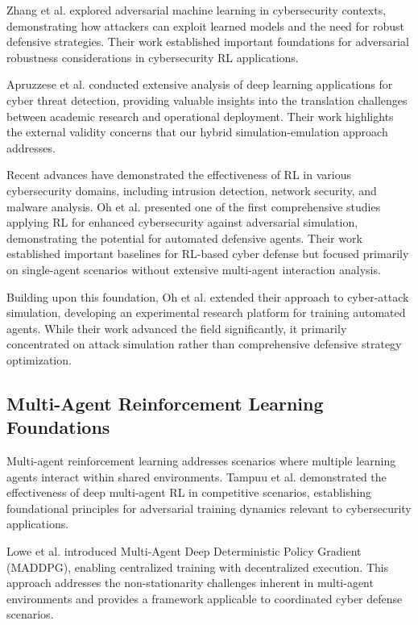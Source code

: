 \documentclass[12pt,twoside]{article}
\theoremstyle{definition}
\theoremstyle{plain}
\begin{document}
Zhang et al. \cite{zhang2020adversarial} explored adversarial machine learning in cybersecurity contexts, demonstrating how attackers can exploit learned models and the need for robust defensive strategies. Their work established important foundations for adversarial robustness considerations in cybersecurity RL applications.

Apruzzese et al. \cite{apruzzese2022deep} conducted extensive analysis of deep learning applications for cyber threat detection, providing valuable insights into the translation challenges between academic research and operational deployment. Their work highlights the external validity concerns that our hybrid simulation-emulation approach addresses.

Recent advances have demonstrated the effectiveness of RL in various cybersecurity domains, including intrusion detection, network security, and malware analysis. Oh et al. \cite{oh2023applying} presented one of the first comprehensive studies applying RL for enhanced cybersecurity against adversarial simulation, demonstrating the potential for automated defensive agents. Their work established important baselines for RL-based cyber defense but focused primarily on single-agent scenarios without extensive multi-agent interaction analysis.

Building upon this foundation, Oh et al. \cite{oh2024employing} extended their approach to cyber-attack simulation, developing an experimental research platform for training automated agents. While their work advanced the field significantly, it primarily concentrated on attack simulation rather than comprehensive defensive strategy optimization.

\subsection{Multi-Agent Reinforcement Learning Foundations}

Multi-agent reinforcement learning addresses scenarios where multiple learning agents interact within shared environments. Tampuu et al. \cite{tampuu2017multiagent} demonstrated the effectiveness of deep multi-agent RL in competitive scenarios, establishing foundational principles for adversarial training dynamics relevant to cybersecurity applications.

Lowe et al. \cite{lowe2017multi} introduced Multi-Agent Deep Deterministic Policy Gradient (MADDPG), enabling centralized training with decentralized execution. This approach addresses the non-stationarity challenges inherent in multi-agent environments and provides a framework applicable to coordinated cyber defense scenarios.
\end{document}
